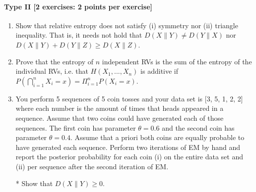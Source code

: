 \documentclass{article}
\begin{document}
\paragraph{Type II [2 exercises: 2 points per exercise]}
\begin{enumerate}
	\item Show that relative entropy does not satisfy (i) symmetry nor (ii) triangle inequality. That is, it needs not hold that $D(X\parallel Y) \neq  D(Y \parallel X)$ nor $D(X\parallel Y) + D(Y\parallel Z) \geq D(X \parallel Z)$.
	\item Prove that the entropy of $n$ independent RVs is the sum of the entropy of the individual RVs, i.e. that  $H(X_1, ..., X_n)$ is additive if $P(\bigcap_{i = 1}^{n} X_i=x) = \Pi_{i = 1}^n P(X_i=x)$.
	\item You perform 5 sequences of 5 coin tosses and your data set is  [3, 5, 1, 2, 2]  where each number
	is the amount of times that heads appeared in a sequence. Assume that two coins could have generated
	each of those sequences. The first coin has parameter $ \theta = 0.6 $ and the second coin has 
	parameter $ \theta = 0.4 $. Assume that a priori both coins are equally probable to have generated 
	each sequence. Perform two iterations of EM by hand and report the posterior probability for
	each coin (i) on the entire data set and (ii) per sequence after the second iteration of EM.
	\item[*] Show that $D(X\parallel Y) \geq 0$.

\end{enumerate}
\end{document}
